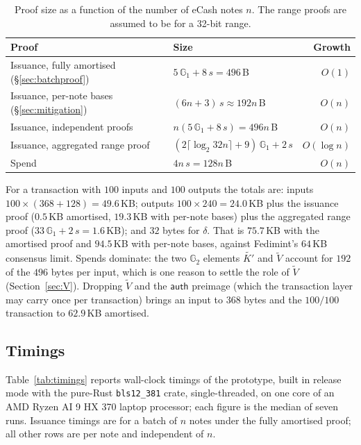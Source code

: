 \documentclass[10pt,a5paper]{article}
\newcommand{\tabsize}{\small}\newcommand{\legendsize}{\footnotesize}
\newcommand{\tabsize}{}\newcommand{\legendsize}{\small}
\newcommand{\K}[1]{#1}                      %
\newcommand{\Gt}[1]{\tilde{#1}}             %
\newcommand{\K}[1]{{\color{ScalarCol}#1}}   %
\newcommand{\Gt}[1]{{\color{GtwoCol}#1}}    %
\newcommand{\GG}[1]{\mathbb{G}_{#1}}
\newcommand{\auth}{\mathsf{auth}}
\begin{document}
\begin{table}[htbp]
\centering
\caption{Proof size as a function of the number of eCash notes $n$. The range
proofs are assumed to be for a 32-bit range.}
\label{tab:sizes}
\tabsize
\begin{tabular}{@{}llr@{}}
\toprule
Proof & Size & Growth \\
\midrule
Issuance, fully amortised (\S\ref{sec:batchproof}) & $5\,\GG{1} + 8\,s = 496$\,B & $O(1)$ \\
Issuance, per-note bases (\S\ref{sec:mitigation}) & $(6n+3)\,s \approx 192n$\,B & $O(n)$ \\
Issuance, independent proofs & $n(5\,\GG{1} + 8\,s) = 496n$\,B & $O(n)$ \\
Issuance, aggregated range proof & $(2\lceil\log_2 32n\rceil + 9)\,\GG{1} + 2\,s$ & $O(\log n)$ \\
Spend & $4n\,s = 128n$\,B & $O(n)$ \\
\bottomrule
\end{tabular}
\end{table}

For a transaction with $100$ inputs and $100$ outputs the totals are: inputs
$100 \times (368 + 128) = 49.6$\,KB; outputs $100 \times 240 = 24.0$\,KB plus
the issuance proof ($0.5$\,KB amortised, $19.3$\,KB with per-note bases) plus
the aggregated range proof ($33\,\GG{1} + 2\,s = 1.6$\,KB); and $32$ bytes for
$\K{\delta}$. That is $75.7$\,KB with the amortised proof and $94.5$\,KB with
per-note bases, against Fedimint's $64$\,KB consensus limit. Spends dominate:
the two $\GG{2}$ elements $\Gt{K'}$ and $\Gt{V}$ account for $192$ of the $496$
bytes per input, which is one reason to settle the role of $\Gt{V}$
(Section~\ref{sec:V}). Dropping $\Gt{V}$ and the $\auth$ preimage (which the
transaction layer may carry once per transaction) brings an input to $368$
bytes and the $100/100$ transaction to $62.9$\,KB amortised.

\subsection{Timings}
\label{sec:timings}

Table~\ref{tab:timings} reports wall-clock timings of the prototype, built in
release mode with the pure-Rust \texttt{bls12\_381} crate, single-threaded, on
one core of an AMD Ryzen AI 9 HX 370 laptop processor; each figure is the
median of seven runs. Issuance timings are for a batch of $n$ notes under the
fully amortised proof; all other rows are per note and independent of $n$.
\end{document}
